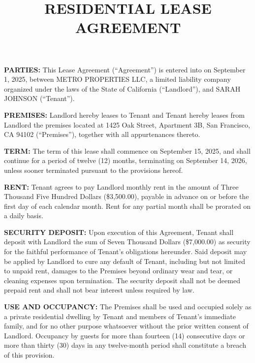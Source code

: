 \documentclass[12pt,letterpaper]{article}
\title{\textbf{RESIDENTIAL LEASE AGREEMENT}}
\author{}
\date{}
\begin{document}
\maketitle

\noindent \textbf{PARTIES:} This Lease Agreement (``Agreement'') is entered into on September 1, 2025, between METRO PROPERTIES LLC, a limited liability company organized under the laws of the State of California (``Landlord''), and SARAH JOHNSON (``Tenant'').

\vspace{0.2cm}
\noindent \textbf{PREMISES:} Landlord hereby leases to Tenant and Tenant hereby leases from Landlord the premises located at 1425 Oak Street, Apartment 3B, San Francisco, CA 94102 (``Premises''), together with all appurtenances thereto.

\vspace{0.2cm}
\noindent \textbf{TERM:} The term of this lease shall commence on September 15, 2025, and shall continue for a period of twelve (12) months, terminating on September 14, 2026, unless sooner terminated pursuant to the provisions hereof.

\vspace{0.2cm}
\noindent \textbf{RENT:} Tenant agrees to pay Landlord monthly rent in the amount of Three Thousand Five Hundred Dollars (\$3,500.00), payable in advance on or before the first day of each calendar month. Rent for any partial month shall be prorated on a daily basis.

\vspace{0.2cm}
\noindent \textbf{SECURITY DEPOSIT:} Upon execution of this Agreement, Tenant shall deposit with Landlord the sum of Seven Thousand Dollars (\$7,000.00) as security for the faithful performance of Tenant's obligations hereunder. Said deposit may be applied by Landlord to cure any default of Tenant, including but not limited to unpaid rent, damages to the Premises beyond ordinary wear and tear, or cleaning expenses upon termination. The security deposit shall not be deemed prepaid rent and shall not bear interest unless required by law.

\vspace{0.2cm}
\noindent \textbf{USE AND OCCUPANCY:} The Premises shall be used and occupied solely as a private residential dwelling by Tenant and members of Tenant's immediate family, and for no other purpose whatsoever without the prior written consent of Landlord. Occupancy by guests for more than fourteen (14) consecutive days or more than thirty (30) days in any twelve-month period shall constitute a breach of this provision.
\end{document}
